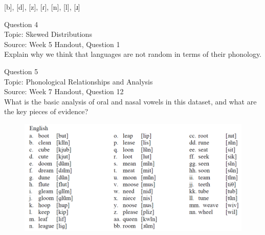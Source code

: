\documentclass[12pt]{article}
\begin{document}
{[b]}, {[d]}, {[z]}, {[ɾ]}, {[n]}, {[l]}, {[ɹ]}


\newpage

{\large Question 4}\\

Topic: Skewed Distributions\\
Source: Week 5 Handout, Question 1\\

Explain why we think that languages are not random in terms of their phonology.\\


\newpage

{\large Question 5}\\

Topic: Phonological Relationships and Analysis\\
Source: Week 7 Handout, Question 12\\

What is the basic analysis of oral and nasal vowels in this dataset, and what are the key pieces of evidence?\\

\begin{figure}[H]
\includegraphics{../images/english12.png}
\end{figure}

\newpage

\begin{center}
\textbf{{\color{red}{\HUGE END OF EXAM}}}\\

\end{center}
\newpage

\begin{center}
\textbf{{\color{blue}{\HUGE START OF EXAM\\}}}

\textbf{{\color{blue}{\HUGE Student ID: 80138\\}}}

\textbf{{\color{blue}{\HUGE \\}}}

\end{center}
\newpage
\end{document}

